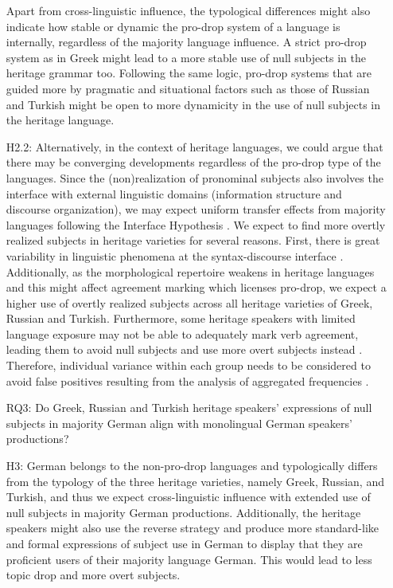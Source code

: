 \documentclass[output=paper,colorlinks,citecolor=brown]{langscibook}
\begin{document}
\begin{enumerate}
Apart from cross-linguistic influence, the typological differences might also indicate how stable or dynamic the pro-drop system of a language is internally, regardless of the majority language influence. A strict pro-drop system as in Greek might lead to a more stable use of null subjects in the heritage grammar too. Following the same logic, pro-drop systems that are guided more by pragmatic and situational factors such as those of Russian and Turkish might be open to more dynamicity in the use of null subjects in the heritage language.
\item[H2.2:] Alternatively, in the context of heritage languages, we could argue that there may be converging developments regardless of the pro-drop type of the languages. Since the (non)realization of pronominal subjects also involves the interface with external linguistic domains (information structure and discourse organization), we may expect uniform transfer effects from majority languages following the Interface Hypothesis \parencite{sorace2011pinning}. We expect to find more overtly realized subjects in heritage varieties for several reasons. First, there is great variability in linguistic phenomena at the syntax-discourse interface \parencite{TsimpliEtAl2004, sorace2011pinning}. Additionally, as the morphological repertoire weakens in heritage languages \parencite{polinsky2018heritage} and this might affect agreement marking which licenses pro-drop, we expect a higher use of overtly realized subjects across all heritage varieties of Greek, Russian and Turkish. Furthermore, some heritage speakers with limited language exposure may not be able to adequately mark verb agreement, leading them to avoid null subjects and use more overt subjects instead \parencite{isurin2011russian, DaskalakiEtAl2019}. Therefore, individual variance within each group needs to be considered to avoid false positives resulting from the analysis of aggregated frequencies \parencite{BAAYEN2008390, winter2011pseudoreplication, brezina2014significant, winter2019statistics}.

\pagebreak
\item[RQ3:] Do Greek, Russian and Turkish heritage speakers’ expressions of null subjects in majority German align with monolingual German speakers’ productions?

\item[H3:] German belongs to the non-pro-drop languages and typologically differs from the typology of the three heritage varieties, namely Greek, Russian, and Turkish, and thus we expect cross-linguistic influence with extended use of null subjects in majority German productions. Additionally, the heritage speakers might also use the reverse strategy and produce more standard-like and formal expressions of subject use in German to display that they are proficient users of their majority language German. This would lead to less topic drop and more overt subjects.


\end{enumerate}
\end{document}

